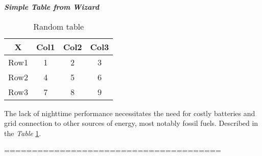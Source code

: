\documentclass{article}
\begin{document}
	
	
	{\Large \textbf{\textit{Simple Table from Wizard}}}
	\begin{table}[H]
		\centering
		\caption{Random table}
		\label{tab:1}
		\begin{tabular}{c||c|c|c}
			\hline
			X & Col1 & Col2 & Col3 \\
			\hline
			\hline
			Row1 & 1 & 2 & 3 \\	
			Row2 & 4 & 5 & 6 \\
			Row3 & 7 & 8 & 9 \\	
			\hline
		\end{tabular}
	\end{table}
	
	The lack of nighttime performance necessitates the need for costly batteries and grid connection to other sources of energy, most notably fossil fuels. Described in the \textit{Table} \ref{tab:1}.
	
	=======================================	
	\pagebreak
	
	
\end{document}
